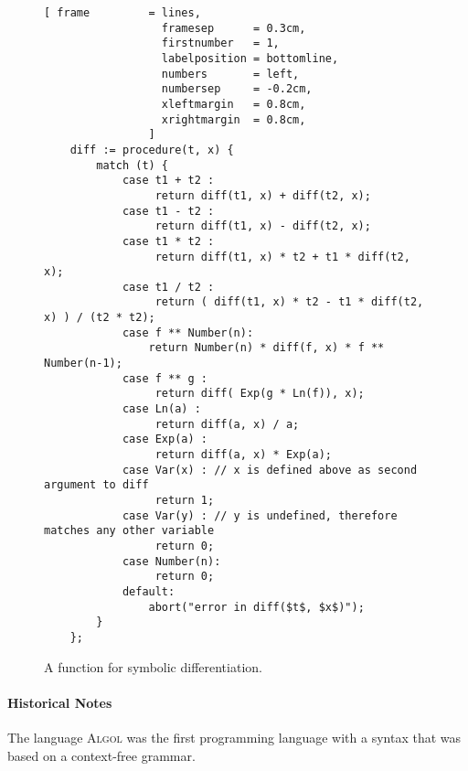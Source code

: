 \begin{figure}[!ht]
\centering
\begin{Verbatim}[ frame         = lines, 
                  framesep      = 0.3cm, 
                  firstnumber   = 1,
                  labelposition = bottomline,
                  numbers       = left,
                  numbersep     = -0.2cm,
                  xleftmargin   = 0.8cm,
                  xrightmargin  = 0.8cm,
                ]
    diff := procedure(t, x) {
        match (t) {
            case t1 + t2 :
                 return diff(t1, x) + diff(t2, x);
            case t1 - t2 :
                 return diff(t1, x) - diff(t2, x);
            case t1 * t2 :
                 return diff(t1, x) * t2 + t1 * diff(t2, x);
            case t1 / t2 :
                 return ( diff(t1, x) * t2 - t1 * diff(t2, x) ) / (t2 * t2);
            case f ** Number(n): 
                return Number(n) * diff(f, x) * f ** Number(n-1);
            case f ** g :
                 return diff( Exp(g * Ln(f)), x);
            case Ln(a) :
                 return diff(a, x) / a;
            case Exp(a) : 
                 return diff(a, x) * Exp(a);
            case Var(x) : // x is defined above as second argument to diff
                 return 1;
            case Var(y) : // y is undefined, therefore matches any other variable
                 return 0;
            case Number(n):
                 return 0;    
            default:
                abort("error in diff($t$, $x$)");
        }
    };
\end{Verbatim}
\vspace*{-0.3cm}
\caption{A function for symbolic differentiation.}
\label{fig:diff.stlx}
\end{figure}


\paragraph{Historical Notes} The language \textsc{Algol} \cite{backus:1959,naur:1960} was the first
programming language with a syntax that was based on a context-free grammar.  

